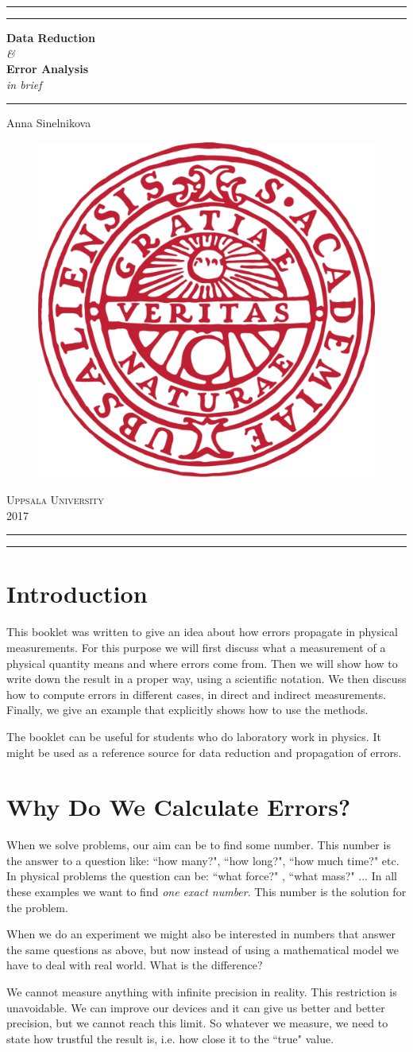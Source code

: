 \documentclass[12pt,a4paper]{article}
\newcommand*{\titleAT}{\begingroup %
\newlength{\drop} %
\drop=0.1\textheight %

\rule{\textwidth}{1pt}\par %
\vspace{2pt}\vspace{-\baselineskip} %
\rule{\textwidth}{0.4pt}\par %

\vspace{\drop} %
\centering %
\textcolor{UURed}{ %
{\Huge \textbf{Data Reduction}}\\[0.75\baselineskip] %
{\Huge \textit{\&}}\\[0.75\baselineskip] %
{\Huge \textbf{Error Analysis}}\\[0.75\baselineskip]
{\Large \textit{in brief}}} %


\vspace{0.10\drop} %
\rule{0.3\textwidth}{0.4pt}\par %
\vspace{\drop} %

{\Large \textsc Anna Sinelnikova}\par %

\vfill %
\begin{figure}[H]
\centering
\includegraphics[width=0.3\linewidth]{Uppsala_University_seal.pdf}
\end{figure}
{\large \textsc{Uppsala University\\2017}}\par %

\vspace*{\drop} %

\rule{\textwidth}{0.4pt}\par %
\vspace{2pt}\vspace{-\baselineskip} %
\rule{\textwidth}{1pt}\par %

\endgroup}
\begin{document}
\thispagestyle{empty} %
\titleAT

\newpage
\tableofcontents
\newpage

\section*{Introduction}
This booklet was written to give an idea about how errors propagate in physical measurements.
For this purpose we will first discuss what a measurement of a physical quantity means and where errors come from. Then we will show how to write down the result in a proper way, using a scientific notation. We then discuss how to compute errors in different cases, in direct and indirect measurements. Finally, we give an example that explicitly shows how to use the methods.

The booklet can be useful for students who do laboratory work in physics. It might be used as a reference source for data reduction and propagation of errors.

\section{Why Do We Calculate Errors?}
When we solve problems, our aim can be to find some number. This number is the answer to a question like: ``how many?", ``how long?", ``how much time?" etc. In physical problems the question can be: ``what force?"
, ``what mass?" ... In all these examples we want to find \textit{one exact number}. This number is the solution for the problem.

When we do an experiment we might also be interested in numbers that answer the same questions as above, but now instead of using a mathematical model we have to deal with real world. What is the difference?

We cannot measure anything with infinite precision in reality. This restriction is unavoidable. We can improve our devices and it can give us better and better precision, but we cannot reach this limit. So whatever we measure, we need to state
how trustful the result is, i.e. how close it to the ``true" value.
\end{document}
